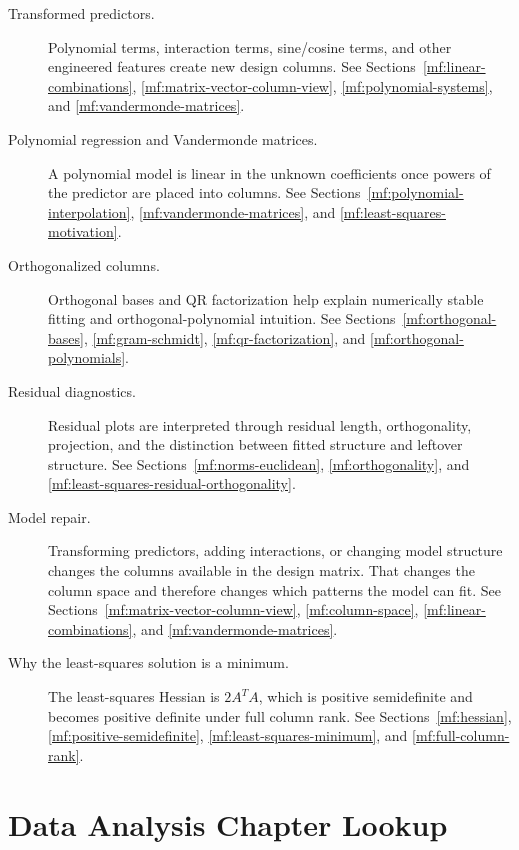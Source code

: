\begin{description}
    \item[Transformed predictors.] Polynomial terms, interaction terms, sine/cosine terms, and other engineered features create new design columns. See Sections~\ref{mf:linear-combinations}, \ref{mf:matrix-vector-column-view}, \ref{mf:polynomial-systems}, and \ref{mf:vandermonde-matrices}.

    \item[Polynomial regression and Vandermonde matrices.] A polynomial model is linear in the unknown coefficients once powers of the predictor are placed into columns. See Sections~\ref{mf:polynomial-interpolation}, \ref{mf:vandermonde-matrices}, and \ref{mf:least-squares-motivation}.

    \item[Orthogonalized columns.] Orthogonal bases and QR factorization help explain numerically stable fitting and orthogonal-polynomial intuition. See Sections~\ref{mf:orthogonal-bases}, \ref{mf:gram-schmidt}, \ref{mf:qr-factorization}, and \ref{mf:orthogonal-polynomials}.

    \item[Residual diagnostics.] Residual plots are interpreted through residual length, orthogonality, projection, and the distinction between fitted structure and leftover structure. See Sections~\ref{mf:norms-euclidean}, \ref{mf:orthogonality}, and \ref{mf:least-squares-residual-orthogonality}.

    \item[Model repair.] Transforming predictors, adding interactions, or changing model structure changes the columns available in the design matrix. That changes the column space and therefore changes which patterns the model can fit. See Sections~\ref{mf:matrix-vector-column-view}, \ref{mf:column-space}, \ref{mf:linear-combinations}, and \ref{mf:vandermonde-matrices}.

    \item[Why the least-squares solution is a minimum.] The least-squares Hessian is \(2A^TA\), which is positive semidefinite and becomes positive definite under full column rank. See Sections~\ref{mf:hessian}, \ref{mf:positive-semidefinite}, \ref{mf:least-squares-minimum}, and \ref{mf:full-column-rank}.
\end{description}

\section{Data Analysis Chapter Lookup}
\label{mf:da-bridge-chapter-lookup}

